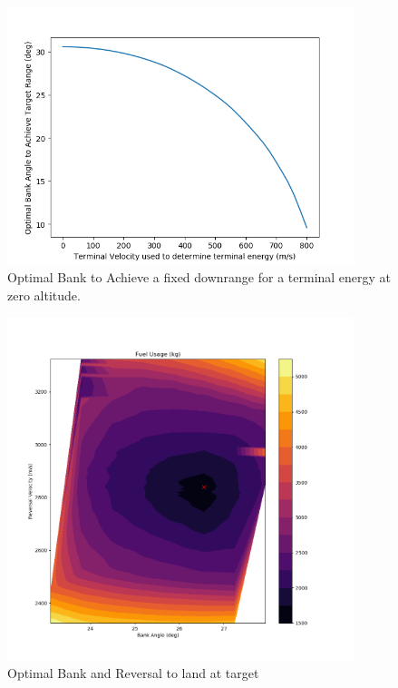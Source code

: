 \documentclass[]{article}
\begin{document}
\begin{figure}[h!]
		\centering
		\includegraphics[width=0.9\textwidth]{PredictorCorrector_BankvsVelocity} 
		\caption{Optimal Bank to Achieve a fixed downrange for a terminal energy at zero altitude.}
		\label{fig_bank_vs_vel}

\end{figure}

\begin{figure}[h!]
	\centering
	\includegraphics[width=0.9\textwidth]{ContourComparison} 
	\caption{Optimal Bank and Reversal to land at target}
	\label{fig_contour}
	
\end{figure}
\end{document}
